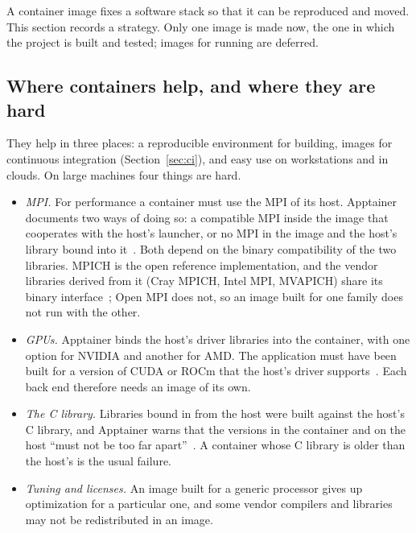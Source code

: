 \documentclass[11pt,a4paper]{article}
\begin{document}
A container image fixes a software stack so that it can be reproduced and
moved.  This section records a strategy.  Only one image is made now, the
one in which the project is built and tested; images for running are
deferred.

\subsection{Where containers help, and where they are hard}

They help in three places: a reproducible environment for building, images
for continuous integration (Section~\ref{sec:ci}), and easy use on
workstations and in clouds.  On large machines four things are hard.

\begin{itemize}
  \item \emph{MPI.}  For performance a container must use the MPI of its
        host.  Apptainer documents two ways of doing so: a compatible MPI
        inside the image that cooperates with the host's launcher, or no
        MPI in the image and the host's library bound into
        it~\cite{apptainermpi}.  Both depend on the binary compatibility of
        the two libraries.  MPICH is the open reference implementation,
        and the vendor libraries derived from it (Cray MPICH, Intel MPI,
        MVAPICH) share its binary interface~\cite{mpichabi}; Open MPI does
        not, so an image built for one family does not run with the other.
  \item \emph{GPUs.}  Apptainer binds the host's driver libraries into the
        container, with one option for NVIDIA and another for AMD.  The
        application must have been built for a version of CUDA or ROCm that
        the host's driver supports~\cite{apptainergpu}.  Each back end
        therefore needs an image of its own.
  \item \emph{The C library.}  Libraries bound in from the host were built
        against the host's C library, and Apptainer warns that the versions
        in the container and on the host \enquote{must not be too far
        apart}~\cite{apptainergpu}.  A container whose C library is older
        than the host's is the usual failure.
  \item \emph{Tuning and licenses.}  An image built for a generic processor
        gives up optimization for a particular one, and some vendor
        compilers and libraries may not be redistributed in an image.
\end{itemize}
\end{document}
